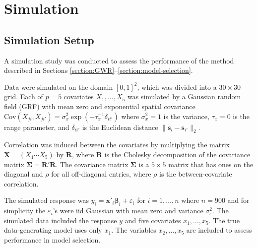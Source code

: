 \documentclass[authoryear, review, 11pt]{elsarticle}
\begin{document}

\section{Simulation \label{section:simulation}}
	\subsection{Simulation Setup}
	A simulation study was conducted to assess the performance of the method described in Sections \ref{section:GWR}--\ref{section:model-selection}. 
	
	Data were simulated on the domain $[0,1]^2$, which was divided into a $30 \times 30$ grid. Each of $p=5$ covariates $X_1, \dots, X_5$ was simulated by a Gaussian random field (GRF) with mean zero and exponential spatial covariance $\text{Cov} \left(X_{ji}, X_{ji'} \right) = \sigma_x^2 \exp{\left( -\tau_x^{-1} \delta_{ii'} \right)}$ where $\sigma_x^2=1$ is the variance, $\tau_x = 0$ is the range parameter, and $\delta_{ii'}$ is the Euclidean distance $\|\bm{s}_i - \bm{s}_{i'}\|_2$.
	
	Correlation was induced between the covariates by multiplying the matrix $\bm{X} = \left(X_1 \cdots X_5\right)$ by $\bm{R}$, where $\bm{R}$ is the Cholesky decomposition of the covariance matrix $\bm{\Sigma} = \bm{R}'\bm{R}$. The covariance matrix $\bm{\Sigma}$ is a $5 \times 5$ matrix that has ones on the diagonal and $\rho$ for all off-diagonal entries, where $\rho$ is the between-covariate correlation.
		
	The simulated response was $y_i = \bm{x}'_i \bm{\beta}_i + \varepsilon_i$ for $i=1, \dots, n$ where $n=900$ and for simplicity the $\varepsilon_i$'s were iid Gaussian with mean zero and variance $\sigma_\varepsilon^2$. The simulated data included the response $y$ and five covariates $x_1, \dots, x_5$. The true data-generating model uses only $x_1$. The variables $x_2, \dots, x_5$ are included to assess performance in model selection.
	
\end{document}
